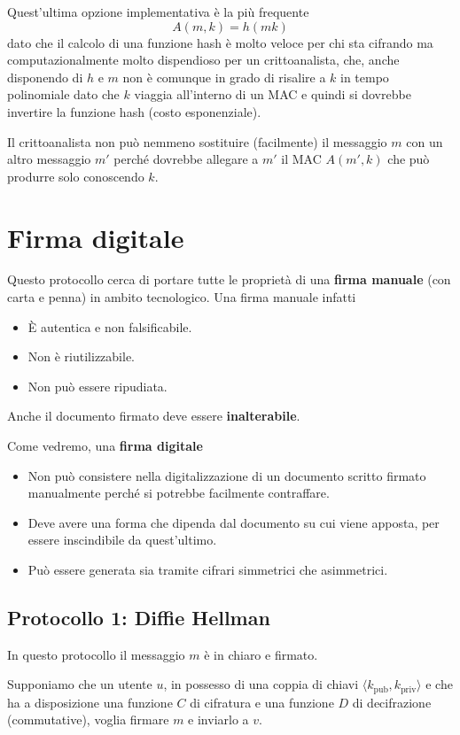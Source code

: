 Quest'ultima opzione implementativa \`e la pi\`u frequente
\[ A(m, k) = h(m k) \]
dato che il calcolo di una funzione hash \`e molto veloce per chi sta cifrando ma computazionalmente molto dispendioso
per un crittoanalista, che, anche disponendo di $h$ e $m$ non \`e comunque in grado di risalire a $k$ in tempo
polinomiale dato che $k$ viaggia all'interno di un MAC e quindi si dovrebbe invertire la funzione hash (costo
esponenziale).

Il crittoanalista non pu\`o nemmeno sostituire (facilmente) il messaggio $m$ con un altro messaggio $m'$ perch\'e
dovrebbe allegare a $m'$ il MAC $A(m', k)$ che pu\`o produrre solo conoscendo $k$.

\section{Firma digitale}
Questo protocollo cerca di portare tutte le propriet\`a di una \textbf{firma manuale} (con carta e penna) in ambito
tecnologico. Una firma manuale infatti
\begin{itemize}
	\item \`E autentica e non falsificabile.
	\item Non \`e riutilizzabile.
	\item Non pu\`o essere ripudiata.
\end{itemize}
Anche il documento firmato deve essere \textbf{inalterabile}.

Come vedremo, una \textbf{firma digitale}
\begin{itemize}
	\item Non pu\`o consistere nella digitalizzazione di un documento scritto firmato manualmente perch\'e si
	      potrebbe facilmente contraffare.
	\item Deve avere una forma che dipenda dal documento su cui viene apposta, per essere inscindibile da
	      quest'ultimo.
	\item Pu\`o essere generata sia tramite cifrari simmetrici che asimmetrici.
\end{itemize}

\subsection{Protocollo 1: Diffie Hellman}
In questo protocollo il messaggio $m$ \`e in chiaro e firmato.

Supponiamo che un utente $u$, in possesso di una coppia di chiavi $\langle k_\text{pub}, k_\text{priv} \rangle$ e
che ha a disposizione una funzione $C$ di cifratura e una funzione $D$ di decifrazione (commutative), voglia firmare
$m$ e inviarlo a $v$.

